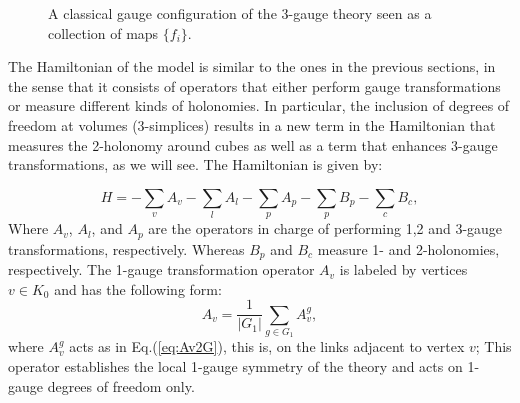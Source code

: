 \documentclass[titlepage,11pt]{article}
\theoremstyle{plain}%
\theoremstyle{definition}
\theoremstyle{remark}
\begin{document}
\begin{figure}[h]
\centering
{}
\caption{\label{fig:3Gconf} A classical gauge configuration of the 3-gauge theory seen as a collection of maps $\{f_i\}$.}
\end{figure}
The Hamiltonian of the model is similar to the ones in the previous sections, in the sense that it consists of operators that either perform gauge transformations or measure different kinds of holonomies. In particular, the inclusion of degrees of freedom at volumes (3-simplices) results in a new term in the Hamiltonian that measures the 2-holonomy around cubes as well as a term that enhances 3-gauge transformations, as we will see. The Hamiltonian is given by:

\begin{equation}\label{eq:H3G}
H= -\sum_{v}A_v -\sum_{l}A_l -\sum_{p}A_p -\sum_{p}B_p -\sum_{c}B_c,
\end{equation}
Where $A_v$, $A_l$, and $A_p$ are the operators in charge of performing 1,2 and 3-gauge transformations, respectively. Whereas $B_p$ and $B_c$ measure 1- and 2-holonomies, respectively. The 1-gauge transformation operator $A_v$ is labeled by vertices $v \in K_0$ and has the following form:
\begin{equation}\label{eq:3GAv}
A_v=\dfrac{1}{|G_1|}\sum_{g \in G_1} A_v^{g},
\end{equation}
where $A_v^g$ acts as in Eq.(\ref{eq:Av2G}), this is, on the links adjacent to vertex $v$; This operator establishes the local 1-gauge symmetry of the theory and acts on 1-gauge degrees of freedom only. 
\end{document}
